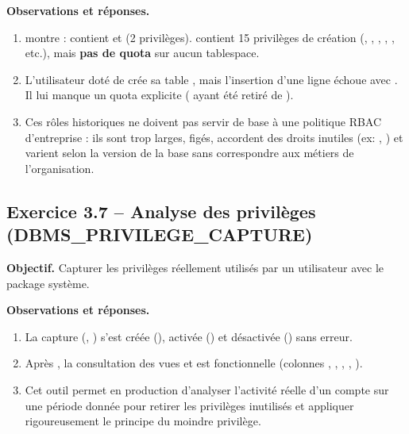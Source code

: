 
\textbf{Observations et réponses.}
\begin{enumerate}
  \item {} montre :  contient  et 
        (2 privilèges).  contient 15 privilèges de création (, , , , , etc.), mais
        \textbf{pas de quota} sur aucun tablespace.
  \item L'utilisateur  doté de  crée sa table , mais
        l'insertion d'une ligne échoue avec . Il
        lui manque un quota explicite ( ayant été retiré de ).
  \item Ces rôles historiques ne doivent pas servir de base à une politique RBAC d'entreprise : ils sont
        trop larges, figés, accordent des droits inutiles (ex: , )
        et varient selon la version de la base sans correspondre aux métiers de l'organisation.
\end{enumerate}

\subsection{Exercice 3.7 -- Analyse des privilèges (DBMS\_PRIVILEGE\_CAPTURE)}
\textbf{Objectif.} Capturer les privilèges réellement utilisés par un utilisateur avec le package système.


\textbf{Observations et réponses.}
\begin{enumerate}
  \item La capture  (, )
        s'est créée (), activée () et désactivée
        () sans erreur.
  \item Après , la consultation des vues  et
         est fonctionnelle (colonnes , ,
        , , ).
  \item Cet outil permet en production d'analyser l'activité réelle d'un compte sur une période donnée pour
        retirer les privilèges inutilisés et appliquer rigoureusement le principe du moindre privilège.
\end{enumerate}
